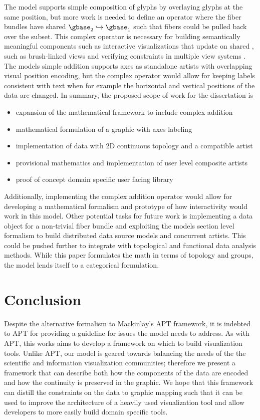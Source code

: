 \documentclass[../main.tex]{subfiles}
\begin{document}
The model supports simple composition of glyphs by overlaying glyphs at the same position, but more work is needed to define an operator where the fiber bundles have shared $\gbase_2 \hookrightarrow \gbase_1$ such that fibers could be pulled back over the subset. This complex operator is necessary for building semantically meaningful components such as interactive visualizations that update on shared \gbase, such as brush-linked views\cite{beckerBrushingScatterplots1987,bujaInteractiveData1991} and verifying constraints in multiple view systems \cite{hullmanKeeping2018}. The models simple addition supports axes as standalone artists with overlapping visual position encoding, but the complex operator would allow for keeping labels consistent with text when for example the horizontal and vertical positions of the data are changed. In summary, the proposed scope of work for the dissertation is
\begin{itemize}
    \item expansion of the mathematical framework to include complex addition
    \item mathematical formulation of a graphic with axes labeling
    \item implementation of data with 2D continuous topology and a compatible artist
    \item provisional mathematics and implementation of user level composite artists
    \item proof of concept domain specific user facing library 
\end{itemize}
Additionally, implementing the complex addition operator would allow for developing a mathematical formalism and prototype of how interactivity would work in this model. Other potential tasks for future work is implementing a data object for a non-trivial fiber bundle and exploiting the models section level formalism to build distributed data source models and concurrent artists. This could be pushed further to integrate with topological\cite{heineSurveyTopologybasedMethods2016} and functional \cite{ramsayFunctionalDataAnalysis2006a} data analysis methods. While this paper formulates the math in terms of topology and groups, the model lends itself to a categorical formulation\cite{fongInvitationAppliedCategory2019,milewskiCategoryTheoryProgrammers}. 


\section{Conclusion}
Despite the alternative formalism to Mackinlay's APT framework, it is indebted to APT for providing a guideline for issues the model needs to address. As with APT, this works aims to develop a framework on which to build visualization tools. Unlike APT, our model is geared towards balancing the needs of the the scientific and information visualization communities; therefore we present a framework that can describe both how the components of the data are encoded and how the continuity is preserved in the graphic. We hope that this framework can distill the constraints on the data to graphic mapping such that it can be used to improve the architecture of a heavily used visualization tool and allow developers to more easily build domain specific tools. 
\end{document}
